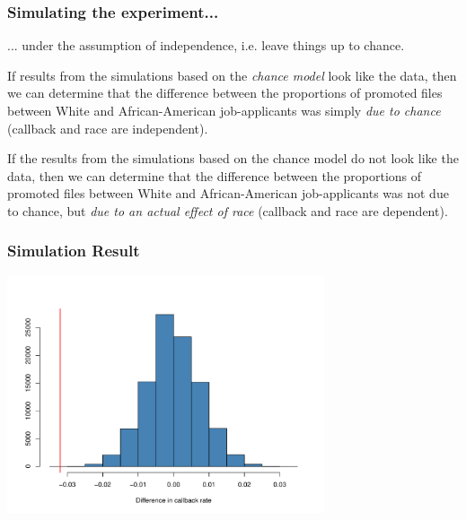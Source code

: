\documentclass[notes,11pt, aspectratio=169]{beamer}
\newcommand{\hl}[1]{\textit{\textcolor{hlblue}{#1}}}
\begin{document}
\begin{frame}
\frametitle{Simulating the experiment...}

... under the assumption of independence, i.e. leave things up to chance. \\

\vspace{0.5cm}

If results from the simulations based on the \hl{chance model} look like the data, then we can determine that the difference between the proportions of promoted files between White and African-American job-applicants was simply \hl{due to chance} (callback and race are independent). \\

\vspace{0.5cm}

If the results from the simulations based on the chance model do not look like the data, then we can determine that the difference between the proportions of promoted files between White and African-American job-applicants was not due to chance, but \hl{due to an actual effect of race} (callback and race are dependent).

\end{frame}


\begin{frame}
\frametitle{Simulation Result}
\begin{center}
\includegraphics[width=0.7\textwidth]{graphs/l02f17}
\end{center}
\end{frame}


\end{document}
